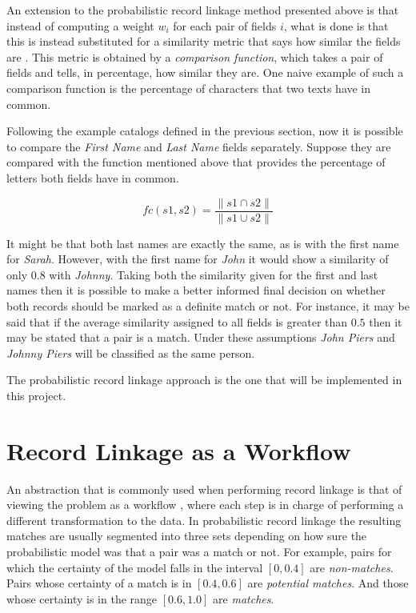 \documentclass[epsfig,a4paper,11pt,titlepage,twoside,openany]{book}
\begin{document}
An extension to the probabilistic record linkage method presented above is that instead of computing a weight $w_i$ for each pair of fields $i$, what is done is that this is instead substituted for a similarity metric that says how similar the fields are \cite{porter1997approximate,winkler1990string}. This metric is obtained by a \textit{comparison function}, which takes a pair of fields and tells, in percentage, how similar they are. One naive example of such a comparison function is the percentage of characters that two texts have in common.

Following the example catalogs defined in the previous section, now it is possible to compare the \textit{First Name} and \textit{Last Name} fields separately. Suppose they are compared with the function mentioned above that provides the percentage of letters both fields have in common.

$$
fc(s1, s2) = \frac{\| s1 \cap s2 \|}{\| s1 \cup s2 \|}
$$

It might be that both last names are exactly the same, as is with the first name for \textit{Sarah}. However, with the first name for \textit{John} it would show a similarity of only $0.8$ with \textit{Johnny}. Taking both the similarity given for the first and last names then it is possible to make a better informed final decision on whether both records should be marked as a definite match or not.  For instance, it may be said that if the average similarity assigned to all fields is greater than $0.5$ then it may be stated that a pair is a match. Under these assumptions \textit{John Piers} and \textit{Johnny Piers} will be classified as the same person.

The probabilistic record linkage approach is the one that will be implemented in this project.



\section{Record Linkage as a Workflow}
\label{sec:rl-as-a-workflow}

An abstraction that is commonly used when performing record linkage is that of viewing the problem as a workflow \cite{christen12_data}, where each step is in charge of performing a different transformation to the data. In probabilistic record linkage \cite{fellegi69_theor_recor_linkag} the resulting matches are usually segmented into three sets depending on how sure the probabilistic model was that a pair was a match or not. For example, pairs for which the certainty of the model falls in the interval $[0, 0.4]$ are \textit{non-matches}. Pairs whose certainty of a match is in $[0.4, 0.6]$ are \textit{potential matches}. And those whose certainty is in the range $[0.6, 1.0]$ are \textit{matches}.
\end{document}
